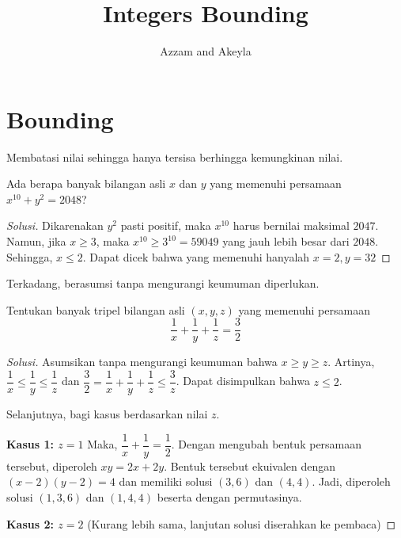 \documentclass[11pt]{scrartcl}
\title{Integers Bounding}
\author{Azzam and Akeyla}
\begin{document}
\maketitle

\renewcommand*\contentsname{Daftar Isi}
\tableofcontents

\newpage

\section{Bounding}
Membatasi nilai sehingga hanya tersisa berhingga kemungkinan nilai. 

\begin{example}
    Ada berapa banyak bilangan asli $x$ dan $y$ yang memenuhi persamaan $x^{10} + y^2 = 2048$? 
\end{example}

\begin{proof}[Solusi]
    Dikarenakan $y^2$ pasti positif, maka $x^{10}$ harus bernilai maksimal $2047$. Namun, jika $x \geq 3$, maka $x^{10} \geq 3^{10} = 59049$ yang jauh lebih besar dari $2048$. Sehingga, $x \leq 2$. Dapat dicek bahwa yang memenuhi hanyalah $x = 2, y = 32$
\end{proof}

Terkadang, berasumsi tanpa mengurangi keumuman diperlukan.

\begin{example}
    Tentukan banyak tripel bilangan asli $(x, y, z)$ yang memenuhi persamaan \[\dfrac{1}{x} + \dfrac{1}{y} + \dfrac{1}{z} = \dfrac{3}{2}\]
\end{example}

\begin{proof}[Solusi]
    Asumsikan tanpa mengurangi keumuman bahwa $x \geq y \geq z$. Artinya, $\dfrac{1}{x} \leq \dfrac{1}{y} \leq \dfrac{1}{z}$ dan $\dfrac{3}{2} = \dfrac{1}{x} + \dfrac{1}{y} + \dfrac{1}{z} \leq \dfrac{3}{z}$. Dapat disimpulkan bahwa $z \leq 2$.

    Selanjutnya, bagi kasus berdasarkan nilai $z$.

    \textbf{Kasus 1: $z = 1$} Maka, $\dfrac{1}{x} + \dfrac{1}{y} = \dfrac{1}{2}$. Dengan mengubah bentuk persamaan tersebut, diperoleh $xy = 2x + 2y$. Bentuk tersebut ekuivalen dengan $(x - 2)(y - 2) = 4$ dan memiliki solusi $(3, 6)$ dan $(4, 4)$. Jadi, diperoleh solusi $(1, 3, 6)$ dan $(1, 4, 4)$ beserta dengan permutasinya.

    \textbf{Kasus 2: $z = 2$} (Kurang lebih sama, lanjutan solusi diserahkan ke pembaca)
\end{proof}
\end{document}

